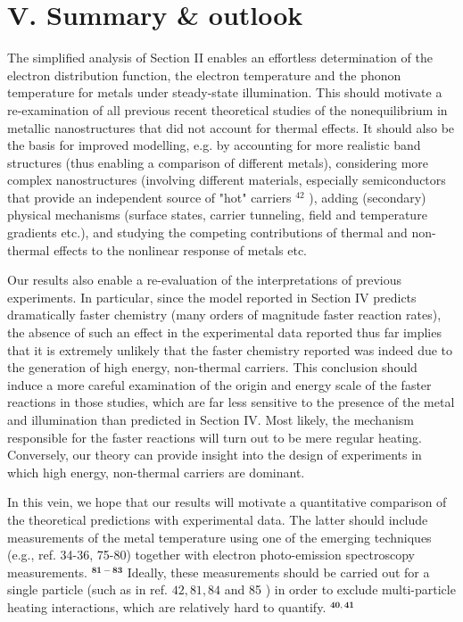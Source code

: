 \documentclass[10pt]{article}
\begin{document}
\section*{V. Summary \& outlook}
The simplified analysis of Section II enables an effortless determination of the electron distribution function, the electron temperature and the phonon temperature for metals under steady-state illumination. This should motivate a re-examination of all previous recent theoretical studies of the nonequilibrium in metallic nanostructures that did not account for thermal effects. It should also be the basis for improved modelling, e.g. by accounting for more realistic band structures (thus enabling a comparison of different metals), considering more complex nanostructures (involving different materials, especially semiconductors that provide an independent source of "hot" carriers ${ }^{42}$ ), adding (secondary) physical mechanisms (surface states, carrier tunneling, field and temperature gradients etc.), and studying the competing contributions of thermal and non-thermal effects to the nonlinear response of metals etc.

Our results also enable a re-evaluation of the interpretations of previous experiments. In particular, since the model reported in Section IV predicts dramatically faster chemistry (many orders of magnitude faster reaction rates), the absence of such an effect in the experimental data reported thus far implies that it is extremely unlikely that the faster chemistry reported was indeed due to the generation of high energy, non-thermal carriers. This conclusion should induce a more careful examination of the origin and energy scale of the faster reactions in those studies, which are far less sensitive to the presence of the metal and illumination than predicted in Section IV. Most likely, the mechanism responsible for the faster reactions will turn out to be mere regular heating. Conversely, our theory can provide insight into the design of experiments in which high energy, non-thermal carriers are dominant.

In this vein, we hope that our results will motivate a quantitative comparison of the theoretical predictions with experimental data. The latter should include measurements of the metal temperature using one of the emerging techniques (e.g., ref. 34-36, 75-80) together with electron photo-emission spectroscopy measurements. ${ }^{\mathbf{8 1 - 8 3}}$ Ideally, these measurements should be carried out for a single particle (such as in ref. $42,81,84$ and 85 ) in order to exclude multi-particle heating interactions, which are relatively hard to quantify. ${ }^{\mathbf{4 0 , 4 1}}$
\end{document}
